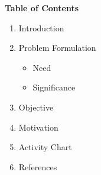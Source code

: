 \documentclass{article}
\begin{document}
\begin{center}
{\fontsize{15}{16}\selectfont \textbf{Table of Contents}}
\end{center}
\bigskip
\begin{enumerate}
	\item  {\fontsize{13}{16}\selectfont Introduction}
	\item {\fontsize{13}{16}\selectfont Problem Formulation}
		\renewcommand{\labelitemi}{$\rightarrow$}

		\begin{itemize}
			\item {\fontsize{13}{16}\selectfont Need}
			\item {\fontsize{13}{16}\selectfont Significance}
		\end{itemize}
	\item {\fontsize{13}{16}\selectfont Objective}
	\item {\fontsize{13}{16}\selectfont Motivation}
	\item {\fontsize{13}{16}\selectfont Activity Chart}
	\item {\fontsize{13}{16}\selectfont References}
	


\end{enumerate}
\end{document}
